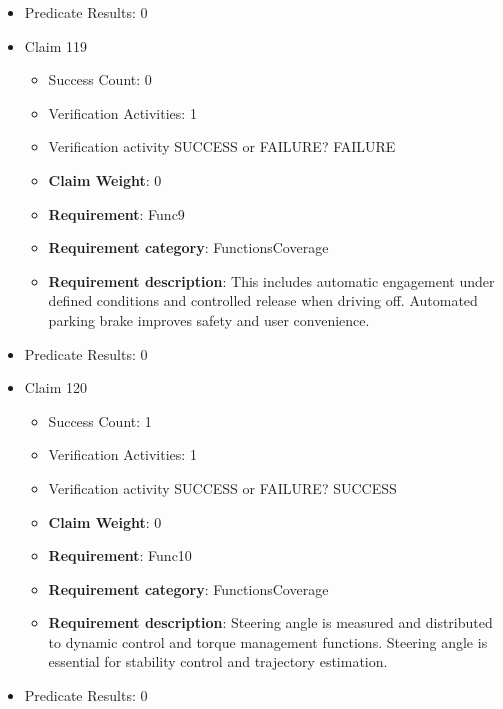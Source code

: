 \documentclass{article}
\begin{document}
\begin{itemize}
\begin{itemize}
				\end{itemize}
				
									    
				\item Predicate Results: 0

  				  \item Claim 119
				\begin{itemize}
			    	\item Success Count: 0 
			    	\item Verification Activities: 1
					\item Verification activity SUCCESS or FAILURE? FAILURE
					\item \textbf{Claim Weight}: 0
						\item \textbf{Requirement}: Func9 
						\item \textbf{Requirement category}: FunctionsCoverage 
						\item \textbf{Requirement description}: This includes automatic engagement under defined conditions and controlled release when driving off. Automated parking brake improves safety and user convenience.
					
				\end{itemize}
				
									    
				\item Predicate Results: 0

  				  \item Claim 120
				\begin{itemize}
			    	\item Success Count: 1 
			    	\item Verification Activities: 1
					\item Verification activity SUCCESS or FAILURE? SUCCESS
					\item \textbf{Claim Weight}: 0
						\item \textbf{Requirement}: Func10 
						\item \textbf{Requirement category}: FunctionsCoverage 
						\item \textbf{Requirement description}: Steering angle is measured and distributed to dynamic control and torque management functions. Steering angle is essential for stability control and trajectory estimation.
					
				\end{itemize}
				
									    
				\item Predicate Results: 0


\end{itemize}
\end{document}
